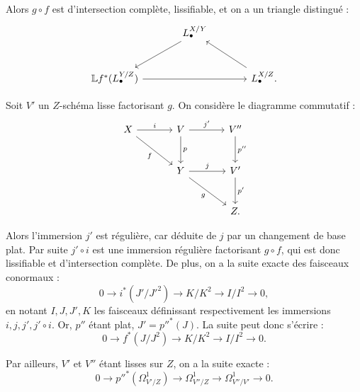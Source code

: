 \documentclass[11pt]{article}
\begin{document}
Alors $g\circ f$ est d'intersection complète, lissifiable, et on a un triangle distingué :
\[
\begin{tikzcd}[column sep=large,row sep=large]
& L^{X/Y}_\bullet \arrow[dl] \\
\mathbb Lf^*(L^{Y/Z}_\bullet) \arrow[rr] && L^{X/Z}_\bullet . \arrow[ul]
\end{tikzcd}
\]

Soit $V'$ un $Z$-schéma lisse factorisant $g$. On considère le diagramme commutatif :
\[
\begin{tikzcd}[column sep=large,row sep=large]
X \arrow[r,"i"] \arrow[dr,"f"'] & V \arrow[r,"j'"] \arrow[d,"p"] & V'' \arrow[d,"p''"]\\
& Y \arrow[r,"j"] \arrow[dr,"g"'] & V' \arrow[d,"p'"]\\
& & Z .
\end{tikzcd}
\]

Alors l'immersion $j'$ est régulière, car déduite de $j$ par un changement de base plat. Par suite $j'\circ i$ est une immersion régulière factorisant $g\circ f$, qui est donc lissifiable et d'intersection complète. De plus, on a la suite exacte des faisceaux conormaux :
\[
0\longrightarrow i^*(J'/J'^2)\longrightarrow K/K^2\longrightarrow I/I^2\longrightarrow0,
\]
en notant $I,J,J',K$ les faisceaux définissant respectivement les immersions $i,j,j',j'\circ i$. Or, $p''$ étant plat, $J'=p''^*(J)$. La suite peut donc s'écrire :
\begin{equation}\tag{2.6.1}
0\longrightarrow f^*(J/J^2)\longrightarrow K/K^2\longrightarrow I/I^2\longrightarrow0.
\end{equation}

Par ailleurs, $V'$ et $V''$ étant lisses sur $Z$, on a la suite exacte :
\[
0\longrightarrow p''^*(\Omega^1_{V'/Z})\longrightarrow\Omega^1_{V''/Z}\longrightarrow\Omega^1_{V''/V'}\longrightarrow0.
\]
\end{document}
